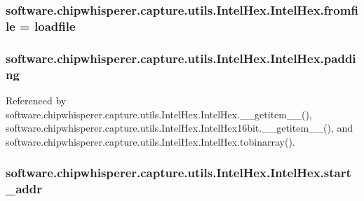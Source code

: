 \subsubsection[{fromfile}]{\setlength{\rightskip}{0pt plus 5cm}software.\+chipwhisperer.\+capture.\+utils.\+Intel\+Hex.\+Intel\+Hex.\+fromfile = {\bf loadfile}\hspace{0.3cm}{\ttfamily [static]}}\label{classsoftware_1_1chipwhisperer_1_1capture_1_1utils_1_1IntelHex_1_1IntelHex_aedb3e9ce405494ffb08bfd4051c9bcc7}
\hypertarget{classsoftware_1_1chipwhisperer_1_1capture_1_1utils_1_1IntelHex_1_1IntelHex_af1b0c8c73d204cd8677cf6840511d3b0}{}
\subsubsection[{padding}]{\setlength{\rightskip}{0pt plus 5cm}software.\+chipwhisperer.\+capture.\+utils.\+Intel\+Hex.\+Intel\+Hex.\+padding}\label{classsoftware_1_1chipwhisperer_1_1capture_1_1utils_1_1IntelHex_1_1IntelHex_af1b0c8c73d204cd8677cf6840511d3b0}


Referenced by software.\+chipwhisperer.\+capture.\+utils.\+Intel\+Hex.\+Intel\+Hex.\+\_\+\+\_\+getitem\+\_\+\+\_\+(), software.\+chipwhisperer.\+capture.\+utils.\+Intel\+Hex.\+Intel\+Hex16bit.\+\_\+\+\_\+getitem\+\_\+\+\_\+(), and software.\+chipwhisperer.\+capture.\+utils.\+Intel\+Hex.\+Intel\+Hex.\+tobinarray().

\hypertarget{classsoftware_1_1chipwhisperer_1_1capture_1_1utils_1_1IntelHex_1_1IntelHex_a5da95579a9d232f27b10682ef2422316}{}
\subsubsection[{start\+\_\+addr}]{\setlength{\rightskip}{0pt plus 5cm}software.\+chipwhisperer.\+capture.\+utils.\+Intel\+Hex.\+Intel\+Hex.\+start\+\_\+addr}\label{classsoftware_1_1chipwhisperer_1_1capture_1_1utils_1_1IntelHex_1_1IntelHex_a5da95579a9d232f27b10682ef2422316}


